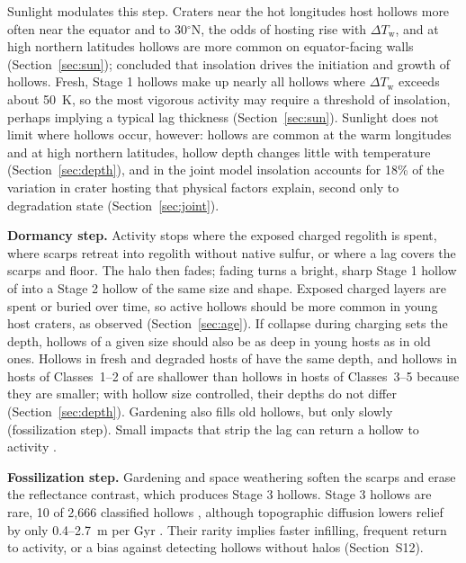 \documentclass[article,review]{planetary}
\begin{document}
Sunlight modulates this step. Craters near the hot longitudes host hollows more often near the equator and to 30$^\circ$N, the odds of hosting rise with $\Delta T_\mathrm{w}$, and at high northern latitudes hollows are more common on equator-facing walls (Section~\ref{sec:sun}); \textcite{deutsch2025} concluded that insolation drives the initiation and growth of hollows. Fresh, Stage 1 hollows make up nearly all hollows where $\Delta T_\mathrm{w}$ exceeds about 50~K, so the most vigorous activity may require a threshold of insolation, perhaps implying a typical lag thickness (Section~\ref{sec:sun}). Sunlight does not limit where hollows occur, however: hollows are common at the warm longitudes and at high northern latitudes, hollow depth changes little with temperature (Section~\ref{sec:depth}), and in the joint model insolation accounts for 18\% of the variation in crater hosting that physical factors explain, second only to degradation state (Section~\ref{sec:joint}).

\textbf{Dormancy step.} Activity stops where the exposed charged regolith is spent, where scarps retreat into regolith without native sulfur, or where a lag covers the scarps and floor. The halo then fades; fading turns a bright, sharp Stage 1 hollow of \textcite{deutsch2025} into a Stage 2 hollow of the same size and shape. Exposed charged layers are spent or buried over time, so active hollows should be more common in young host craters, as observed (Section~\ref{sec:age}). If collapse during charging sets the depth, hollows of a given size should also be as deep in young hosts as in old ones. Hollows in fresh and degraded hosts of \textcite{herrick2018} have the same depth, and hollows in hosts of Classes~1--2 of \textcite{kinczykMorphologicalEvaluationCrater2020} are shallower than hollows in hosts of Classes~3--5 because they are smaller; with hollow size controlled, their depths do not differ (Section~\ref{sec:depth}). Gardening also fills old hollows, but only slowly (fossilization step). Small impacts that strip the lag can return a hollow to activity \parencite{blewett2016}.

\textbf{Fossilization step.} Gardening and space weathering soften the scarps and erase the reflectance contrast, which produces Stage 3 hollows. Stage 3 hollows are rare, 10 of 2,666 classified hollows \parencite{deutsch2025}, although topographic diffusion lowers relief by only 0.4--2.7~m per Gyr \parencite{phillips2021}. Their rarity implies faster infilling, frequent return to activity, or a bias against detecting hollows without halos (Section~S12).
\end{document}
